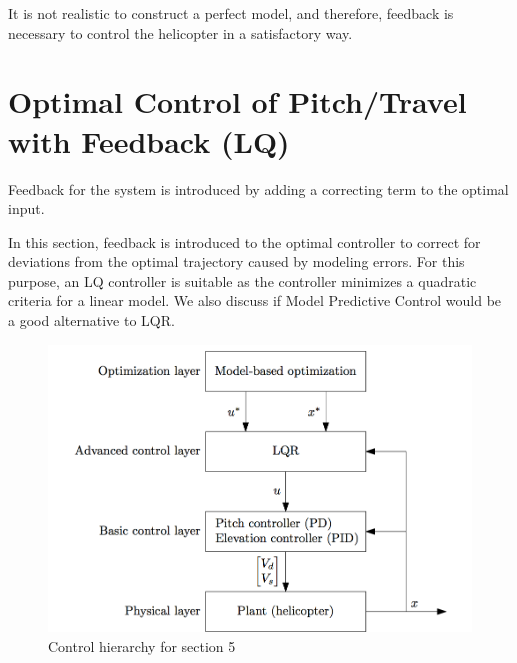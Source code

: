 \documentclass[11pt,a4paper,USenglish]{article} %
\begin{document}
It is not realistic to construct a perfect model, and therefore, feedback is necessary to control the helicopter in a satisfactory way.

\section{Optimal Control of Pitch/Travel with Feedback (LQ)}\label{sec:prob3}

Feedback for the system is introduced by adding a correcting term to the optimal input.

In this section, feedback is introduced to the optimal controller to correct for deviations from the optimal trajectory caused by modeling errors. For this purpose, an LQ controller is suitable as the controller minimizes a quadratic criteria for a linear model. We also discuss if Model Predictive Control would be a good alternative to LQR.

\begin{figure}[!h]
    \begin{minipage}{\textwidth}
\centerline{\includegraphics[width=1.0\textwidth]{10_3bilde}}
    \end{minipage}
    \caption{Control hierarchy for section 5}
	\label{fig:10_3bilde}
\end{figure}
\end{document}
